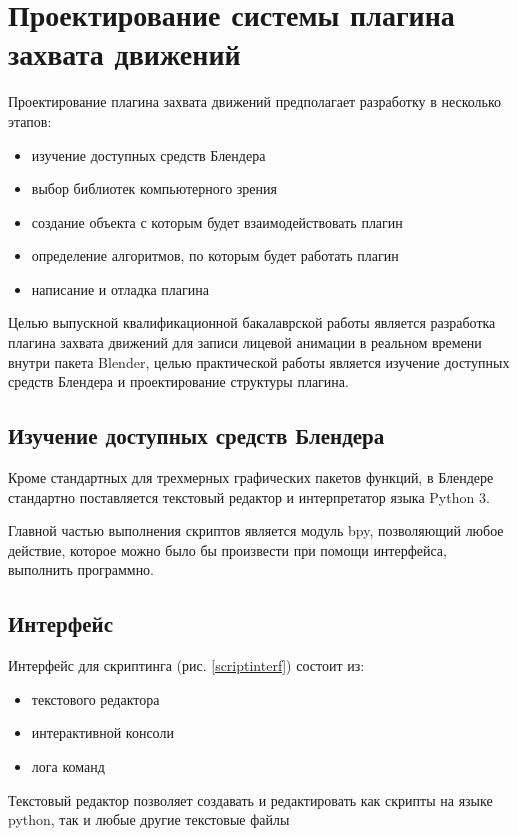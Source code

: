 \section{Проектирование системы плагина захвата движений}

Проектирование плагина захвата движений предполагает разработку в несколько этапов:
\begin{itemize}
	\item изучение доступных средств Блендера
	\item выбор библиотек компьютерного зрения
	\item создание объекта с которым будет взаимодействовать плагин
	\item определение алгоритмов, по которым будет работать плагин
	\item написание и отладка плагина
\end{itemize}

Целью выпускной квалификационной бакалаврской работы является разработка плагина захвата движений для записи лицевой анимации в реальном времени внутри пакета Blender, целью практической работы является изучение доступных средств Блендера и проектирование структуры плагина.

\subsection{Изучение доступных средств Блендера}

Кроме стандартных для трехмерных графических пакетов функций, в Блендере стандартно поставляется текстовый редактор и интерпретатор языка Python 3.

Главной частью выполнения скриптов является модуль bpy, позволяющий любое действие, которое можно было бы произвести при помощи интерфейса, выполнить программно.

\subsection{Интерфейс}
Интерфейс для скриптинга (рис. \ref{scriptinterf}) состоит из:
\begin{itemize}
	\item текстового редактора
	\item интерактивной консоли
	\item лога команд
\end{itemize}

Текстовый редактор позволяет создавать и редактировать как скрипты на языке python, так и любые другие текстовые файлы


